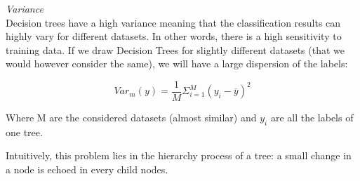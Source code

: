 \textit{Variance} \\

Decision trees have a high variance meaning that the classification results can highly vary for different datasets. In other words, there is a high sensitivity to training data. If we draw Decision Trees for slightly different datasets (that we would however consider the same), we will have a large dispersion of the labels:

$$Var_m(y) = \frac{1}{M}\Sigma_{i=1}^M(y_i - \overline{y})^2$$

Where M are the considered datasets (almost similar) and $y_i$ are all the labels of one tree.

Intuitively, this problem lies in the hierarchy process of a tree: a small change in a node is echoed in every child nodes.

\vspace{5mm}